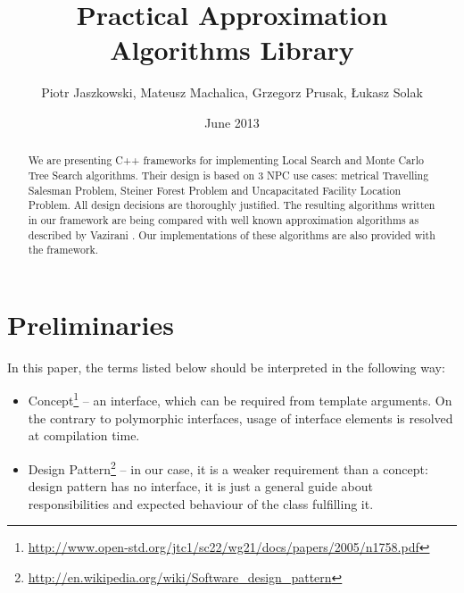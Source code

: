 \documentclass[licencjacka]{pracamgr}
\author{Piotr Jaszkowski, Mateusz Machalica, Grzegorz Prusak, Łukasz Solak}
\title{Practical Approximation Algorithms Library}
\date{June 2013}
\begin{document}
\maketitle

\begin{abstract}
  We are presenting C++ frameworks for implementing Local Search
  and Monte Carlo Tree Search algorithms. Their design is based
  on 3 NPC use cases: metrical Travelling Salesman Problem,
  Steiner Forest Problem and Uncapacitated Facility Location Problem.
  All design decisions are thoroughly justified. The resulting
  algorithms written in our framework are being compared with
  well known approximation algorithms as described by Vazirani \cite{Vazirani}.
  Our implementations of these algorithms are also provided with the framework.
\end{abstract}

\tableofcontents

\newpage

\section{Preliminaries}
In this paper, the terms listed below should be interpreted in the following way:
\begin{itemize}
\item Concept\footnote{\url{http://www.open-std.org/jtc1/sc22/wg21/docs/papers/2005/n1758.pdf}}
	-- an interface, which can be required from template arguments.
	On the contrary to polymorphic interfaces, usage of interface elements is resolved at compilation time.
\item Design Pattern\footnote{\url{http://en.wikipedia.org/wiki/Software_design_pattern}}
	-- in our case, it is a weaker requirement than a concept: design pattern has no interface,
	it is just a general guide about responsibilities and expected behaviour of the class
	fulfilling it.
\end{itemize}








\appendix



\end{document}
